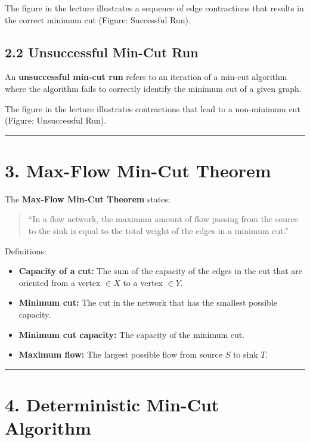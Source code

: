 \documentclass[12pt]{article}
\begin{document}
The figure in the lecture illustrates a sequence of edge contractions that results in the correct minimum cut (Figure: Successful Run).

\subsection*{2.2 Unsuccessful Min-Cut Run}

An \textbf{unsuccessful min-cut run} refers to an iteration of a min-cut algorithm where the algorithm fails to correctly identify the minimum cut of a given graph.

The figure in the lecture illustrates contractions that lead to a non-minimum cut (Figure: Unsuccessful Run).

\hrule
\vspace{0.5cm}

\section*{3. Max-Flow Min-Cut Theorem}

The \textbf{Max-Flow Min-Cut Theorem} states:

\begin{quote}
“In a flow network, the maximum amount of flow passing from the source to the sink is equal to the total weight of the edges in a minimum cut.”
\end{quote}

Definitions:

\begin{itemize}
    \item \textbf{Capacity of a cut:}  
    The sum of the capacity of the edges in the cut that are oriented from a vertex \( \in X \) to a vertex \( \in Y \).

    \item \textbf{Minimum cut:}  
    The cut in the network that has the smallest possible capacity.

    \item \textbf{Minimum cut capacity:}  
    The capacity of the minimum cut.

    \item \textbf{Maximum flow:}  
    The largest possible flow from source \( S \) to sink \( T \).
\end{itemize}

\hrule
\vspace{0.5cm}

\section*{4. Deterministic Min-Cut Algorithm}
\end{document}
